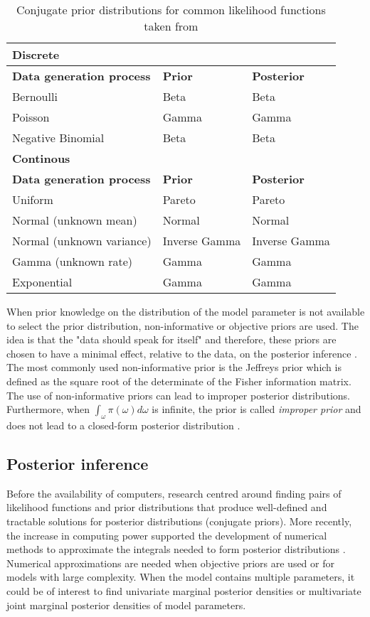 \begin{table}[hb	]
\centering
\caption{Conjugate prior distributions for common likelihood functions taken from \citep{Fink1997}}
\label{tab0:priors}
\begin{tabular}{l l l}
\toprule
\textbf{Discrete} & &\\
\midrule
\midrule
\textbf{Data generation process} & \textbf{Prior} & \textbf{Posterior} \\ 
\midrule 
Bernoulli & Beta & Beta \\
Poisson & Gamma  & Gamma \\
Negative Binomial & Beta & Beta \\
\midrule
\midrule
\textbf{Continous} & & \\
\midrule
\midrule
\textbf{Data generation process} & \textbf{Prior} & \textbf{Posterior} \\ 
\midrule
Uniform  & Pareto & Pareto \\ 
Normal (unknown mean) &  Normal  & Normal \\ 
Normal (unknown variance) &  Inverse Gamma  & Inverse Gamma \\ 
Gamma (unknown rate) &  Gamma  & Gamma \\ 
Exponential &  Gamma  & Gamma \\ 
\bottomrule
\end{tabular}
\end{table} 

When prior knowledge on the distribution of the model parameter is not available to select the prior distribution, non-informative or objective priors are used. The idea is that the "data should speak for itself" and therefore, these priors are chosen to have a minimal effect, relative to the data, on the posterior inference \citep{Bernardo2000}. The most commonly used non-informative prior is the Jeffreys prior \citep{Jeffreys1946} which is defined as the square root of the determinate of the Fisher information matrix. The use of non-informative priors can lead to improper posterior distributions. Furthermore, when $\int_\omega\pi(\omega)d\omega$ is infinite, the prior is called \emph{improper prior} and does not lead to a closed-form posterior distribution \citep{Bernardo2003}.

\subsection{Posterior inference} \label{sec0:posterior_inference}

Before the availability of computers, research centred around finding pairs of likelihood functions and prior distributions that produce well-defined and tractable solutions for posterior distributions (conjugate priors). More recently, the increase in computing power supported the development of numerical methods to approximate the integrals needed to form posterior distributions \citep{Fink1997}. Numerical approximations are needed when objective priors are used or for models with large complexity. When the model contains multiple parameters, it could be of interest to find univariate marginal posterior densities or multivariate joint marginal posterior densities of model parameters.\\

